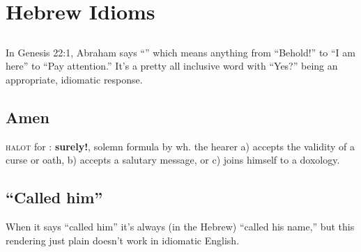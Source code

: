 \section{Hebrew Idioms}\label{app:idioms}
\subsection{}
In Genesis 22:1, Abraham says ``'' which means anything from ``Behold!'' to ``I am here'' to ``Pay attention.'' It's a pretty all inclusive word with ``Yes?'' being an appropriate, idiomatic response.

\subsection{Amen}
\textsc{halot} for : \textbf{surely!}, solemn formula by wh\@. the hearer a) accepts the validity of a curse or oath, b) accepts a salutary message, or c) joins himself to a doxology.

\subsection{``Called him''}
When it says ``called him'' it's always (in the Hebrew) ``called his name,'' but this rendering just plain doesn't work in idiomatic English.
